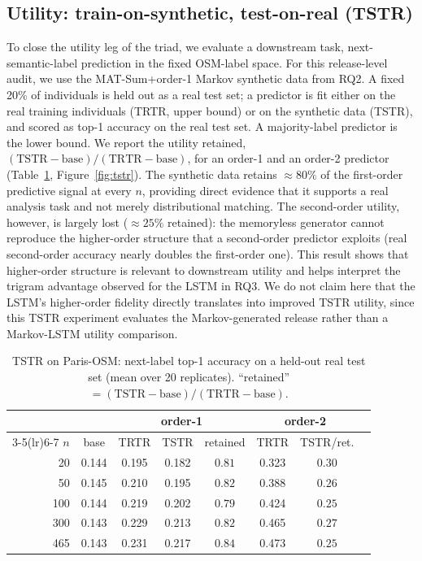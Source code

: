 \documentclass[sigconf,nonacm]{acmart}
\begin{document}
\subsection{Utility: train-on-synthetic, test-on-real (TSTR)}
\label{sec:tstr}
To close the utility leg of the triad, we evaluate a downstream task, next-semantic-label prediction in the fixed OSM-label space. For this release-level audit, we use the MAT-Sum+order-1 Markov synthetic data from RQ2. A fixed 20\% of individuals is held out as a real test set; a predictor is fit either on the real training individuals (TRTR, upper bound) or on the
synthetic data (TSTR), and scored as top-1 accuracy on the real test set. A majority-label predictor is the lower bound. We report the utility retained,
$(\mathrm{TSTR}-\mathrm{base})/(\mathrm{TRTR}-\mathrm{base})$, for an order-1 and an order-2
predictor (Table~\ref{tab:tstr}, Figure~\ref{fig:tstr}). The synthetic data retains
$\approx\!80\%$ of the first-order predictive signal at every $n$, providing direct evidence that
it supports a real analysis task and not merely distributional matching. The second-order utility,
however, is largely lost ($\approx\!25\%$ retained): the memoryless generator cannot reproduce the
higher-order structure that a second-order predictor exploits (real second-order accuracy nearly
doubles the first-order one). This result shows that higher-order structure is relevant to downstream utility and helps interpret the trigram advantage observed for the LSTM in RQ3. We do not claim here that the LSTM's higher-order fidelity directly translates into improved TSTR utility, since this TSTR experiment evaluates the Markov-generated release rather than a Markov-LSTM utility comparison.


\begin{table}[t]
  \caption{TSTR on Paris-OSM: next-label top-1 accuracy on a held-out real test set (mean over
  20 replicates). ``retained'' $=(\mathrm{TSTR}-\mathrm{base})/(\mathrm{TRTR}-\mathrm{base})$.}
  \label{tab:tstr}
  \small
  \begin{tabular}{@{}rccccccc@{}}
    \toprule
     & & \multicolumn{3}{c}{order-1} & \multicolumn{2}{c}{order-2} \\
    \cmidrule(lr){3-5}\cmidrule(lr){6-7}
    $n$ & base & TRTR & TSTR & retained & TRTR & TSTR/ret. \\
    \midrule
    20  & 0.144 & 0.195 & 0.182 & $0.81$ & 0.323 & $0.30$ \\
    50  & 0.145 & 0.210 & 0.195 & $0.82$ & 0.388 & $0.26$ \\
    100 & 0.144 & 0.219 & 0.202 & $0.79$ & 0.424 & $0.25$ \\
    300 & 0.143 & 0.229 & 0.213 & $0.82$ & 0.465 & $0.27$ \\
    465 & 0.143 & 0.231 & 0.217 & $0.84$ & 0.473 & $0.25$ \\
    \bottomrule
  \end{tabular}
\end{table}
\end{document}
